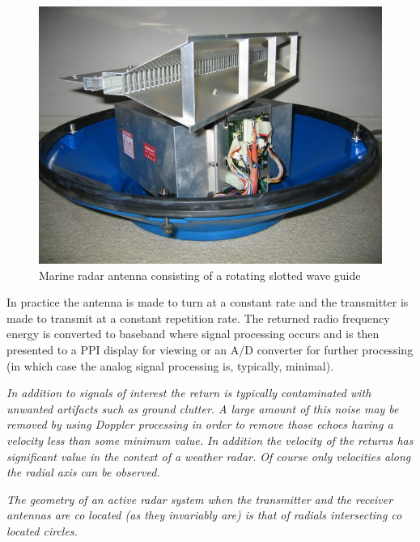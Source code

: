 \documentclass[a4paper]{report}
\newcommand\textstyleEmphasis[1]{\textit{#1}}
\numberwithin{equation}{chapter}
\begin{document}
\begin{figure}
\centering 
\includegraphics[scale=.75]{marine_radar_010.jpg}
\caption[Marine radar antenna consisting of a rotating slotted wave guide]{Marine radar antenna consisting of a rotating slotted wave guide}
\label{fig:slotted_wave_guide}
\end{figure}

In practice the antenna
is made to turn at a constant rate and the transmitter is made to
transmit at a constant repetition rate. The returned radio frequency
energy is converted to baseband where signal processing occurs and is
then presented to a PPI display for viewing or an A/D converter for
further processing (in which case the analog signal processing is,
typically, minimal). 

\bigskip

\textstyleEmphasis{\textup{In addition to signals of interest the return
is typically contaminated with unwanted artifacts such as ground
clutter. A large amount of this noise may be removed by using Doppler
processing in order }}\textstyleEmphasis{\textup{to
}}\textstyleEmphasis{\textup{remove those echoes having a velocity less
than some minimum value. In addition the velocity of the returns has
significant value in the context of a weather radar. Of course only
velocities along }}\textstyleEmphasis{\textup{the radial axis can be
observed.}} 

\bigskip

\textstyleEmphasis{\textup{The geometry of an active radar system when
the transmitter and the receiver antennas are co
}}\textstyleEmphasis{\textup{located (as they invariably are) is that
of radials intersecting co located circles. }}
\end{document}
